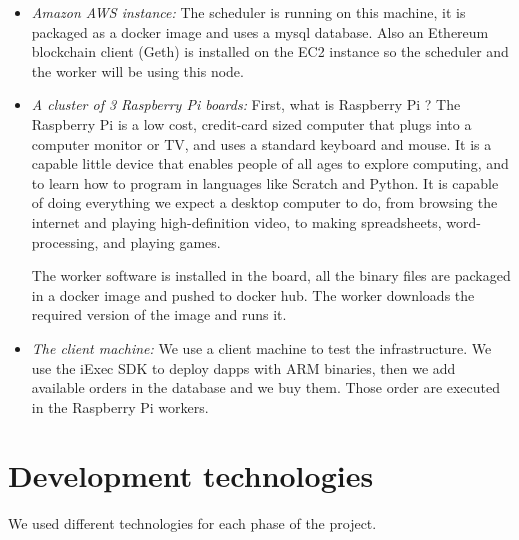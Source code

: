    \begin{itemize}
        \item \textit{Amazon AWS instance: }
        The scheduler is running on this machine, it is packaged as a docker image and uses a mysql
        database. Also an Ethereum blockchain client (Geth) is installed on the EC2 instance so the scheduler
        and the worker will be using this node.

        \item \textit{A cluster of 3 Raspberry Pi boards: }
        First, what is Raspberry Pi ? The Raspberry Pi is a low cost, credit-card sized computer that plugs
        into a computer monitor or TV, and uses a standard keyboard and mouse. It is a capable little device
        that enables people of all ages to explore computing, and to learn how to program in languages like
        Scratch and Python. It is capable of doing everything we  expect a desktop computer to do, from
        browsing the internet and playing high-definition video, to making spreadsheets, word-processing, and
        playing games\cite{raspberry-pi}.

        The worker software is installed in the board, all the binary files are packaged in a docker image
        and pushed to docker hub. The worker downloads the required version of the image and runs it.

        \item \textit{The client machine: }
        We use a client machine to test the infrastructure. We use the iExec SDK to deploy dapps with ARM
        binaries, then we add available orders in the database and we buy them. Those order are executed in
        the Raspberry Pi workers.
   \end{itemize}

\section{Development technologies}
    We used different technologies for each phase of the project.

